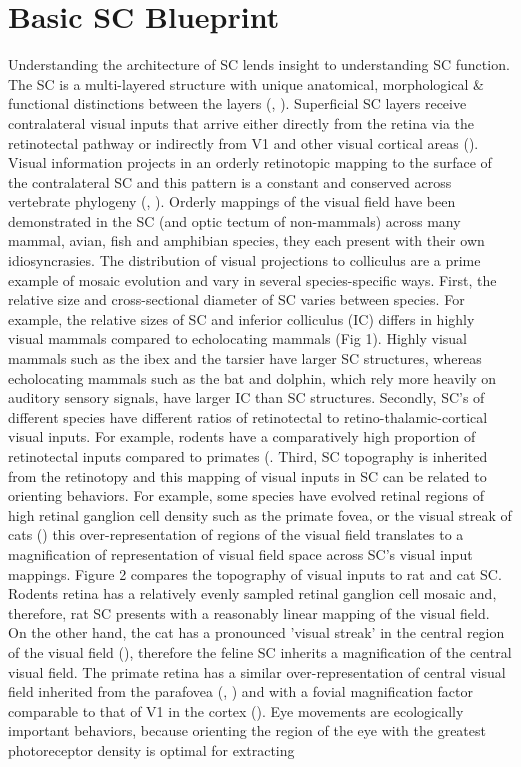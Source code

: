 \documentclass{ar-1col}
\begin{document}
{\section{Basic SC Blueprint}
Understanding the architecture of SC lends insight to understanding SC function. The SC is a multi-layered structure with unique anatomical, morphological & functional distinctions between the layers (\cite{may2006mammalian}, \cite{white2011superior}). Superficial SC layers receive contralateral visual inputs that arrive either directly from the retina via the retinotectal pathway or indirectly from V1 and other visual cortical areas (\cite{boehnke2008importance}). Visual information projects in an orderly retinotopic mapping to the surface of the contralateral SC and this pattern is a constant and conserved across vertebrate phylogeny (\cite{stein1981organization}, \cite{schneider2014brain}). Orderly mappings of the visual field have been demonstrated in the SC (and optic tectum of non-mammals) across many mammal, avian, fish and amphibian species, they each present with their own idiosyncrasies. The distribution of visual projections to colliculus are a prime example of mosaic evolution and vary in several species-specific ways. First, the relative size and cross-sectional diameter of SC varies between species. For example, the relative sizes of SC and inferior colliculus (IC) differs in highly visual mammals compared to echolocating mammals (Fig 1). Highly visual mammals such as the ibex and the tarsier have larger SC structures, whereas echolocating mammals such as the bat and dolphin, which rely more heavily on auditory sensory signals, have larger IC than SC structures. Secondly, SC’s of different species have different ratios of retinotectal to retino-thalamic-cortical visual inputs. For example, rodents have a comparatively high proportion of retinotectal inputs compared to primates (\cite{schneider2014brain}. Third, SC topography is inherited from the retinotopy and this mapping of visual inputs in SC can be related to orienting behaviors. For example, some species have evolved retinal regions of high retinal ganglion cell density such as the primate fovea, or the visual streak of cats (\cite{hughes1977topography}) this over-representation of regions of the visual field translates to a magnification of representation of visual field space across SC's visual input mappings. Figure 2 compares the topography of visual inputs to rat and cat SC. Rodents retina has a relatively evenly sampled retinal ganglion cell mosaic and, therefore, rat SC presents with a reasonably linear mapping of the visual field. On the other hand, the cat has a pronounced 'visual streak' in the central region of the visual field (\cite{hughes1975quantitative}), therefore the feline SC inherits a magnification of the central visual field. The primate retina has a similar over-representation of central visual field inherited from the parafovea (\cite{cynader1972receptive}, \cite{ottes1986visuomotor}) and with a fovial magnification factor comparable to that of V1 in the cortex (\cite{chen2019foveal}). Eye movements are ecologically important behaviors, because orienting the region of the eye with the greatest photoreceptor density is optimal for extracting }
\end{document}
